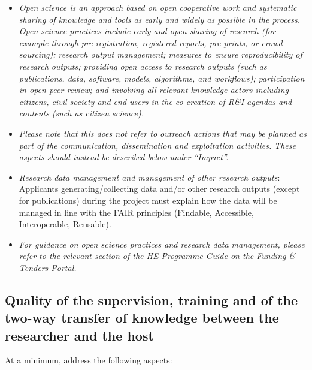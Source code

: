 \documentclass[11pt,draftproposal]{msca-pf}
\begin{document}
\begin{itemize}
    \item \emph{Open science is an approach based on open cooperative work and systematic
    sharing of knowledge and tools as early and widely as possible in the process.
    Open science practices include early and open sharing of research (for example
    through pre-registration, registered reports, pre-prints, or crowd-sourcing);
    research output management; measures to ensure reproducibility of research
    outputs; providing open access to research outputs (such as publications,
    data, software, models, algorithms, and workflows); participation in open
    peer-review; and involving all relevant knowledge actors including citizens,
    civil society and end users in the co-creation of R\&I agendas and contents
    (such as citizen science).}

    \item \emph{Please note that this does not refer to outreach actions that may be
    planned as part of the communication, dissemination and exploitation activities.
    These aspects should instead be described below under ``Impact''.}

    \item \emph{Research data management and management of other research outputs}:
    Applicants generating/collecting data and/or other research outputs (except for
    publications) during the project must explain how the data will be managed
    in line with the FAIR principles (Findable, Accessible, Interoperable,
    Reusable).

    \item \emph{For guidance on open science practices and research data management,
    please refer to the relevant section of the \href{https://ec.europa.eu/info/funding-tenders/opportunities/docs/2021-2027/horizon/guidance/programme-guide_horizon_en.pdf}{HE Programme Guide}
    on the Funding \& Tenders Portal.}
\end{itemize}

\subsection{Quality of the supervision, training and of the two-way transfer of
knowledge between the researcher and the host}

At a minimum, address the following aspects:
\end{document}

